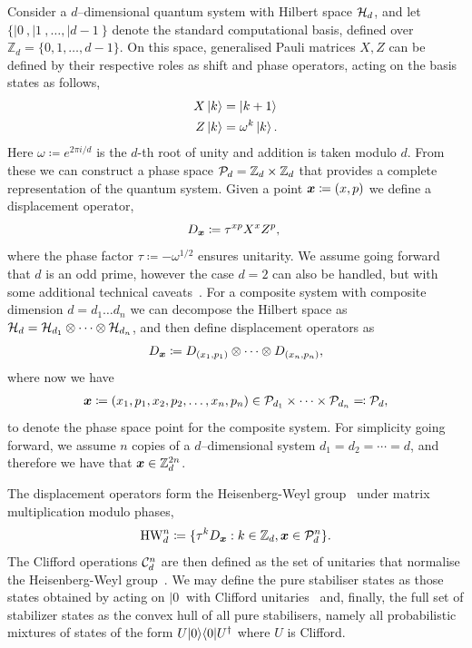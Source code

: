 \documentclass[pra,
aps,
twocolumn,
superscriptaddress,
groupedaddress,
nofootinbib,
reprint
]{revtex4-1}
\begin{document}
Consider a $d$--dimensional quantum system with Hilbert space $\H_d$, and let $\{ |0\>, |1\>, \dots , |d-1\>\}$ denote the standard computational basis, defined over $\mathbb{Z}_d = \{ 0, 1, \dots,d-1 \}$. On this space, generalised Pauli matrices $X, Z$ can be defined by their respective roles as shift and phase operators, acting on the basis states as follows,
\begin{align}
    X \ket{k} &= \ket{k + 1} \label{eq:xpauli}\\
	Z \ket{k} &= \omega^k \ket{k}. \label{eq:zpauli}
\end{align}
Here $\omega \coloneqq e^{2\pi i/d}$ is the $d$-th root of unity and addition is taken modulo $d$. From these we can construct a phase space $\cal{P}_d = \mathbb{Z}_d \times \mathbb{Z}_d$ that provides a complete representation of the quantum system. Given a point $\bmx \coloneqq (x, p)$ we define a displacement operator, 
\begin{equation}\label{eq:ddef}
    D_{\bmx} \coloneqq \tau^{x p} X^{x} Z^{p},\ 
\end{equation}
where the phase factor $\tau \coloneqq -\omega^{1/2}$ ensures unitarity. We assume going forward that $d$ is an odd prime, however the case $d=2$ can also be handled, but with some additional technical caveats~\cite{Appleby_2005}. For a composite system with composite dimension $d = d_1 \dots d_n$ we can decompose the Hilbert space as $\cal{H}_d = \cal{H}_{d_1} \otimes \dots \otimes \cal{H}_{d_n}$, and then define displacement operators as
\begin{equation}\label{eq:composited}
    D_{\bmx} \coloneqq D_{(x_1, p_1)} \otimes \dots \otimes D_{(x_n, p_n)},
\end{equation}
where now we have
\begin{align*}
	\bmx \coloneqq (x_1, p_1, x_2, p_2, \dots, x_n, p_n) \in \cal{P}_{d_1} \times \dots \times \cal{P}_{d_n} \eqqcolon  \cal{P}_d,
\end{align*}
to denote the phase space point for the composite system. 
For simplicity going forward, we assume $n$ copies of a $d$--dimensional system $d_1=d_2 = \cdots = d$, and therefore we have that $\x \in \mathbb{Z}_d^{2n}$.


The displacement operators form the Heisenberg-Weyl group~\cite{Folland_1989, Bengtsson_2006} under matrix multiplication modulo phases,
\begin{equation}\label{eq:gp}
    {\rm{HW}}_d^n \coloneqq \{ \tau^k D_{\bmx}: k \in \mathbb{Z}_d, \bmx \in \cal{P}_d^n\}.
\end{equation}
The Clifford operations $ \cal{C}_d^n $ are then defined as the set of unitaries that normalise the Heisenberg-Weyl group~\cite{Appleby_2005}. We may define the pure stabiliser states as those states obtained by acting on $|0\>$ with Clifford unitaries~\cite{cit:gross3} and, finally, the full set of stabilizer states as the convex hull of all pure stabilisers, namely all probabilistic mixtures of states of the form $U|0\>\<0|U^\dagger$ where $U$ is Clifford. 
\end{document}
